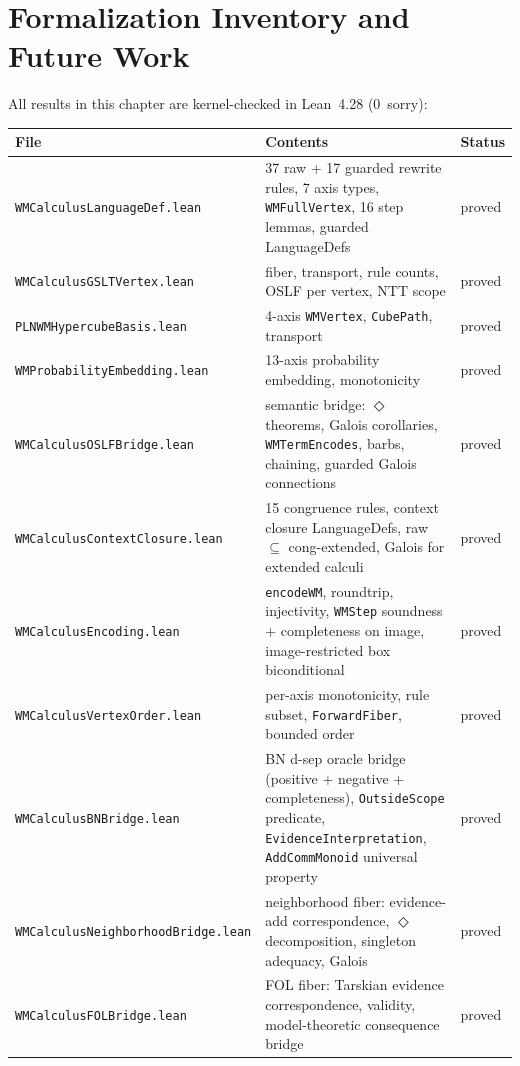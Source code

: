 \documentclass[11pt,openany]{report}
\begin{document}
\section{Formalization Inventory and Future Work}
\label{sec:wm-inventory}
\label{sec:wm-gslt-future}

All results in this chapter are kernel-checked in Lean~4.28 (0~sorry):

\begin{center}
\begin{tabular}{lll}
\toprule
\textbf{File} & \textbf{Contents} & \textbf{Status} \\
\midrule
\texttt{WMCalculusLanguageDef.lean}
  & 37 raw + 17 guarded rewrite rules, 7 axis types,
    \texttt{WMFullVertex}, 16 step lemmas, guarded LanguageDefs
  & proved \\
\texttt{WMCalculusGSLTVertex.lean}
  & fiber, transport, rule counts, OSLF per vertex, NTT scope
  & proved \\
\texttt{PLNWMHypercubeBasis.lean}
  & 4-axis \texttt{WMVertex}, \texttt{CubePath}, transport
  & proved \\
\texttt{WMProbabilityEmbedding.lean}
  & 13-axis probability embedding, monotonicity
  & proved \\
\texttt{WMCalculusOSLFBridge.lean}
  & semantic bridge: $\Diamond$ theorems, Galois corollaries,
    \texttt{WMTermEncodes}, barbs, chaining,
    guarded Galois connections
  & proved \\
\texttt{WMCalculusContextClosure.lean}
  & 15 congruence rules, context closure LanguageDefs,
    raw $\subseteq$ cong-extended, Galois for extended calculi
  & proved \\
\texttt{WMCalculusEncoding.lean}
  & \texttt{encodeWM}, roundtrip, injectivity,
    \texttt{WMStep} soundness + completeness on image,
    image-restricted box biconditional
  & proved \\
\texttt{WMCalculusVertexOrder.lean}
  & per-axis monotonicity, rule subset,
    \texttt{ForwardFiber}, bounded order
  & proved \\
\texttt{WMCalculusBNBridge.lean}
  & BN d-sep oracle bridge (positive + negative + completeness),
    \texttt{OutsideScope} predicate, \texttt{EvidenceInterpretation},
    \texttt{AddCommMonoid} universal property
  & proved \\
\texttt{WMCalculusNeighborhoodBridge.lean}
  & neighborhood fiber: evidence-add correspondence,
    $\Diamond$ decomposition, singleton adequacy, Galois
  & proved \\
\texttt{WMCalculusFOLBridge.lean}
  & FOL fiber: Tarskian evidence correspondence,
    validity, model-theoretic consequence bridge
  & proved \\
\bottomrule
\end{tabular}
\end{center}
\end{document}

